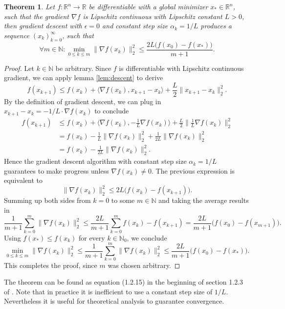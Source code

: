\documentclass[11pt, a4paper]{article}
\newtheorem{theorem}{Theorem}[section]
\newcommand{\N}{\mathbb{N}}
\newcommand{\R}{\mathbb{R}}
\begin{document}
\begin{theorem} \label{thm:descent}
Let $f: \R^n \to \R$ be differentiable with a global minimizer $x_* \in \R^n$, such that the gradient $\nabla f$ is Lipschitz continuous with Lipschitz constant $L>0$, then gradient descent with $\epsilon = 0$ and constant step size $\alpha_k = 1/L$ produces a sequence $(x_k)_{k=0}^\infty$, such that 
\[ \forall m \in \N : \min_{0 \leq k \leq m} \big \| \nabla f(x_k) \big \|_2^2 \leq \frac{2L \big ( f(x_0) - f(x_*) \big )}{m+1}. \]
\end{theorem}

\begin{proof}
Let $k \in \N$ be arbitrary. Since $f$ is differentiable with Lipschitz continuous gradient, we can apply lemma \ref{lem:descent} to derive
\[  f(x_{k+1}) \leq f(x_k) + \big \langle \nabla f(x_k) , x_{k+1} -x_k \big \rangle + \frac{L}{2} \big \| x_{k+1} - x_k \big \|_2^2. \]
By the definition of gradient descent, we can plug in $x_{k+1} - x_k = - 1/L \cdot \nabla f(x_k)$ to conclude
\[ \begin{split} 
f(x_{k+1}) 
&\leq f(x_k) + \big \langle \nabla f(x_k) , - \frac{1}{L} \nabla f(x_k) \big \rangle + \frac{L}{2} \big \| \frac{1}{L} \nabla f(x_k) \big \|_2^2 \\\
&= f(x_k) - \frac{1}{L} \big \| \nabla f(x_k) \big \|_2^2 + \frac{1}{2L} \big \| \nabla f(x_k) \big \|_2^2 \\\
&= f(x_k) - \frac{1}{2L} \big \| \nabla f(x_k) \big \|_2^2.
\end{split} \]
Hence the gradient descent algorithm with constant step size $\alpha_k = 1/L$ guarantees to make progress unless $\nabla f(x_k) \neq 0$. The previous expression is equivalent to
\[ \big \| \nabla f(x_k) \big \|_2^2 \leq 2L \big ( f(x_k) - f(x_{k+1}) \big ). \]
Summing up both sides from $k=0$ to some $m \in \N$ and taking the average results in
\[ \frac{1}{m+1} \sum_{k=0}^{m} \big \| \nabla f(x_k) \big \|_2^2 \leq \frac{2L}{m+1} \sum_{k=0}^{m} f(x_k) - f(x_{k+1}) = \frac{2L}{m+1} \big ( f(x_0) - f(x_{m+1}) \big ). \]
Using $f(x_*) \leq f(x_k)$ for every $k \in \N_0$, we conclude
\[ \min_{0 \leq k \leq m} \big \| \nabla f(x_k) \big \|_2^2 \leq \frac{1}{m+1} \sum_{k=0}^{m} \big \| \nabla f(x_k) \big \|_2^2 \leq \frac{2L}{m+1} \big ( f(x_0) - f(x_*) \big ). \]
This completes the proof, since $m$ was chosen arbitrary.
\end{proof}

The theorem can be found as equation (1.2.15) in the beginning of section 1.2.3 of \cite{ConvexOptimization}. Note that in practice it is inefficient to use a constant step size of $1/L$. Nevertheless it is useful for theoretical analysis to guarantee convergence. \\
\end{document}
